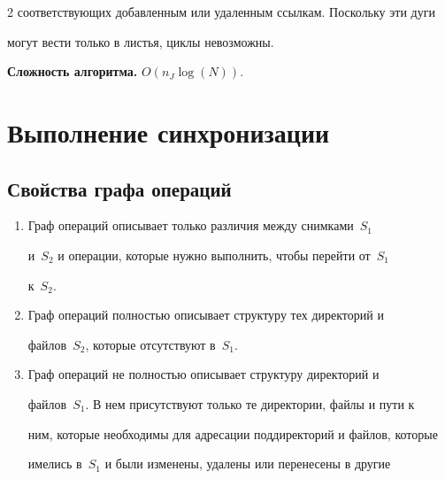 \begin{multicols}{2}
соответствующих до\-бав\-лен\-ным или удаленным ссылкам. Поскольку эти дуги 


могут вести только в листья, циклы не\-воз\-можны.





      \smallskip


      


      \noindent


      \textbf{Сложность алгоритма.} $O(n_J \log (N))$.





\section{Выполнение синхронизации}





\subsection{Свойства графа операций}





\noindent


\begin{enumerate}[1.]


\item Граф операций описывает только различия между снимками~$S_1$ 


и~$S_2$ и операции, которые нужно выполнить, чтобы перейти от~$S_1$ 


к~$S_2$.\\[-15pt]


\item Граф операций полностью описывает структуру тех директорий и 


файлов~$S_2$, которые отсутствуют в~$S_1$.\\[-15pt]


\item Граф операций не полностью описывает структуру директорий и 


файлов~$S_1$. В нем присутствуют только те директории, файлы и пути к 


ним, которые необходимы для адресации поддиректорий и файлов, которые 


имелись в~$S_1$ и были изменены, удалены или перенесены в другие 



\end{enumerate}
\end{multicols}
